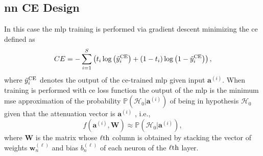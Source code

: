 \documentclass[draftcls,onecolumn,12pt]{IEEEtran}
\begin{document}
\subsection{\ac{nn} CE Design}
\label{sec: ce_train}
 
In this case the \ac{mlp} training is performed via gradient descent minimizing the \ac{ce} defined as
\begin{equation}\label{eq:ce}
CE = -\sum_{i=1}^{S}\left(t_i\log\left(\tilde{y}_i^{\rm CE}\right)+\left(1-t_i\right)\log\left(1-\tilde{y}_i^{\rm CE}\right) \right),
\end{equation}
where $\tilde{y}_i^{\rm CE}$ denotes the output of the \ac{ce}-trained \ac {mlp} given input $\bm{a}^{(i)}$. When training is performed with \ac{ce} loss function the output of the \ac{mlp} is the minimum \ac{mse} approximation of the probability $\mathbb{P}(\mathcal{H}_0|\bm{a}^{(i)})$ of being in hypothesis $\mathcal{H}_0$ given that the attenuation vector is $\bm{a}^{(i)}$ \cite{Bishop2006}, i.e.,
\begin{equation}
    f(\bm{a}^{(i)},\bm{W}) \approx \mathbb{P}(\mathcal{H}_0|\bm{a}^{(i)}),
\end{equation} 
where $\bm{W}$ is the matrix whose $\ell{\rm th}$ column is obtained by stacking the vector of weights $\bm{w}_n^{(\ell)}$ and bias $b_n^{(\ell)}$ of each neuron of the $\ell{\rm th}$ layer.
\end{document}
